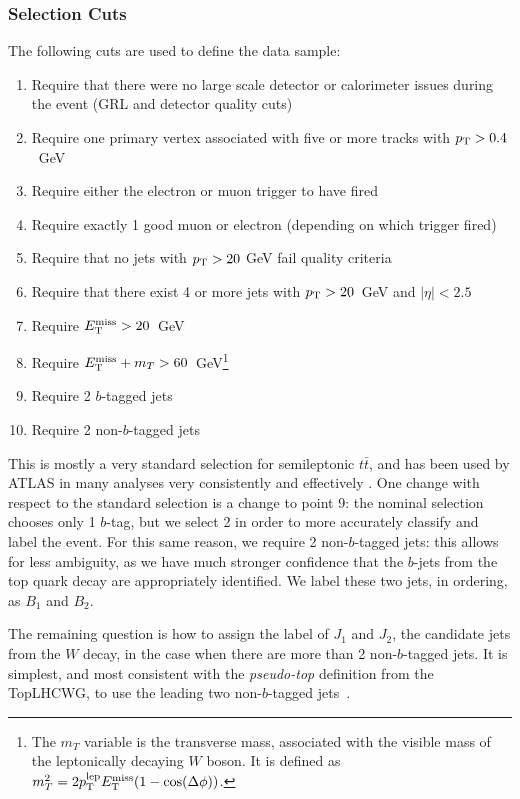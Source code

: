 \subsubsection{Selection Cuts}

The following cuts are used to define the data sample:
%
\begin{enumerate}
\item Require that there were no large scale detector or calorimeter issues during the event (GRL and detector quality cuts)
\item Require one primary vertex associated with five or more tracks with $p_{\text{T}} > 0.4$~GeV
\item Require either the electron or muon trigger to have fired
\item Require exactly 1 good muon or electron (depending on which trigger fired)
\item Require that no jets with $p_{\text{T}} > 20$ GeV fail quality criteria
\item Require that there exist 4 or more jets with $p_{\text{T}} > 20$~GeV and $|\eta| < 2.5$
\item Require $E_{\text{T}}^{\text{miss}} > 20$~GeV
\item Require $E_{\text{T}}^{\text{miss}} + m_T > 60$~GeV\footnote{The $m_T$ variable is the transverse mass, associated with the visible mass of the leptonically decaying $W$ boson. It is defined as $m_T^2 = 2 p_{\text{T}}^{\mathrm{lep}} E_{\text{T}}^{\text{miss}} (1 - \cos(\Delta \phi))$.}
\item Require 2 $b$-tagged jets
\item Require 2 non-$b$-tagged jets
\end{enumerate}
%
This is mostly a very standard selection for semileptonic $t\bar{t}$, and has been used by ATLAS in many analyses very consistently and effectively . One change with respect to the standard selection is a change to point 9: the nominal selection chooses only 1 $b$-tag, but we select 2 in order to more accurately classify and label the event. For this same reason, we require 2 non-$b$-tagged jets: this allows for less ambiguity, as we have much stronger confidence that the $b$-jets from the top quark decay are appropriately identified. We label these two jets, in \pt ordering, as $B_1$ and $B_2$.


The remaining question is how to assign the label of $J_1$ and $J_2$, the candidate jets from the $W$ decay, in the case when there are more than 2 non-$b$-tagged jets. It is simplest, and most consistent with the \textit{pseudo-top} definition from the {\sc TopLHCWG}, to use the leading two non-$b$-tagged jets~\cite{pseudotop,Aad:2015eia}.

